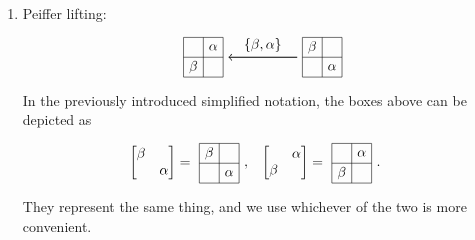 \documentclass[11pt, reqno]{amsart} %
\newcommand{\strrect}[3][]{
  \begin{scope}[every node/.append style={overlay},#1]
    \foreach \x [count=\i] in {#3}{
      \ifx\x\empty
      \else
        \pgfmathsetmacro{\modResult}{mod(\i-1, #2)}
        \pgfmathsetmacro{\quotResult}{(\i-\modResult-1)/#2}
        \node at (\modResult,-\quotResult) {\x};
      \fi
    }
    \foreach \x in {0,1,...,#2}{
      \draw ({-1/2+\x},{1/2})--({-1/2+\x},{-#2+1/2});
      \draw ({-1/2},{1/2-\x})--({#2-1/2},{1/2-\x});
    }
  \end{scope}
}
\theoremstyle{definition}
\theoremstyle{remark}
\numberwithin{equation}{section}
\begin{document}
\begin{enumerate}
  \item  Peiffer lifting:\label{diag:Peiffer22}
  \[
    \begin{tikzpicture}[baseline=-2pt]
      \node (A) at (1.5,0) {\tikz[baseline=-2pt,scale=.5]{\strrect{2}{$\beta$,,,$\alpha$}}};
      \node (B) at (-1.5,0) {\tikz[baseline=-2pt,scale=.5]{\strrect{2}{,$\alpha$,$\beta$,}}};
      \draw [thick,->] (A) to node [anchor=south] {$\{\beta,\alpha\}$} (B);
    \end{tikzpicture}
  \]
  In the previously introduced simplified notation, the boxes above can be depicted as
  \begin{align*}
    \begin{bmatrix}\beta & \\ & \alpha \end{bmatrix} &= \tikz[baseline=-2pt]{\node (B) at (0,0) {\tikz[baseline=-2pt,scale=.5]{\strrect{2}{$\beta$,,,$\alpha$}}};}, & \begin{bmatrix} & \alpha \\ \beta & \end{bmatrix} &= \tikz[baseline=-2pt]{\node (B) at (0,0) {\tikz[baseline=-2pt,scale=.5]{\strrect{2}{,$\alpha$,$\beta$,}}};}.
  \end{align*}
  They represent the same thing, and we use whichever of the two is more convenient.
\end{enumerate}
\end{document}
